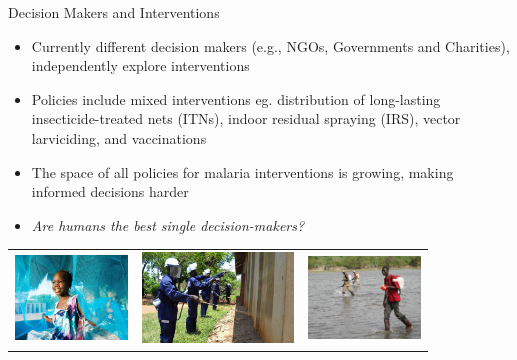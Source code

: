 \documentclass{beamer}
\begin{document}
\begin{frame}{Decision Makers and Interventions}

\begin{itemize}
\item Currently different decision makers (e.g., NGOs, Governments and Charities), independently explore interventions
\item Policies include mixed interventions eg. distribution of long-lasting insecticide-treated nets (ITNs), indoor residual spraying (IRS), vector larviciding, and vaccinations
\item The space of all policies for malaria interventions is growing, making informed decisions harder 
\item \textit{Are humans the best single decision-makers?}
\end{itemize}

\centering
        \begin{tabular}{ccc}
        
        \includegraphics[width=3cm]{images/Bednet.jpeg}
        &
         \includegraphics[width=4cm]{images/IRS.jpg}
         &
         \includegraphics[width=3cm]{images/larv.jpeg}
        
      \end{tabular}

\end{frame}
%
%
%
%
%        
%        
%
%
%
%
\end{document}
